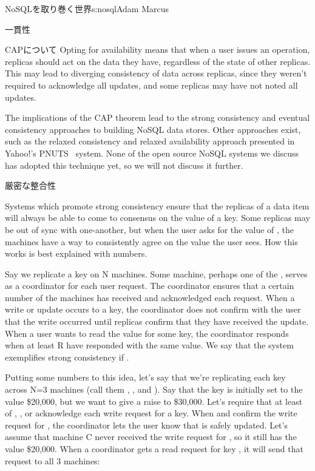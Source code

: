 \begin{aosachapter}{NoSQLを取り巻く世界}{s:nosql}{Adam Marcus}
\begin{aosasect1}{一貫性}
\begin{aosasect2}{CAPについて}
Opting for availability means that when a user issues an operation,
replicas should act on the
data they have, regardless of the state of other replicas.  This may
lead to diverging consistency of data across replicas, since they
weren't required to acknowledge all updates, and some replicas may
have not noted all updates.

The implications of the CAP theorem lead to the strong consistency and
eventual consistency approaches to building NoSQL data stores.  Other
approaches exist, such as the relaxed consistency and relaxed
availability approach presented in Yahoo!'s PNUTS~\cite{bib:pnuts} system.  None of
the open source NoSQL systems we discuss has adopted this technique yet,
so we will not discuss it further.

\end{aosasect2}

\begin{aosasect2}{厳密な整合性}

Systems which promote strong consistency ensure that the replicas of a
data item will always be able to come to consensus on the value of a
key.  Some replicas may be out of sync with one-another, but when the
user asks for the value of , the machines have
a way to consistently agree on the value the user sees.  How this
works is best explained with numbers.

Say we replicate a key on N machines.  Some machine, perhaps one of
the , serves as a coordinator for each user request.  The
coordinator ensures that a certain number of the  machines has
received and acknowledged each request.  When a write or update occurs
to a key, the coordinator does not confirm with the user that the
write occurred until  replicas confirm that they have received
the update.  When a user wants to read the value for some key, the
coordinator responds when at least R have responded with the same
value.  We say that the system exemplifies strong consistency if
.

Putting some numbers to this idea, let's say that we're replicating
each key across N=3 machines (call them , , and
).  Say that the key  is initially set
to the value \$20,000, but we want to give  a raise
to \$30,000.  Let's require that at least  of ,
, or  acknowledge each write request for a key.  When
 and  confirm the write request for , the coordinator lets the user know that
 is safely updated.  Let's assume that machine
C never received the write request for , so it
still has the value \$20,000.  When a coordinator gets a read request
for key , it will send that request to all 3
machines:


\end{aosasect2}
\end{aosasect1}
\end{aosachapter}
